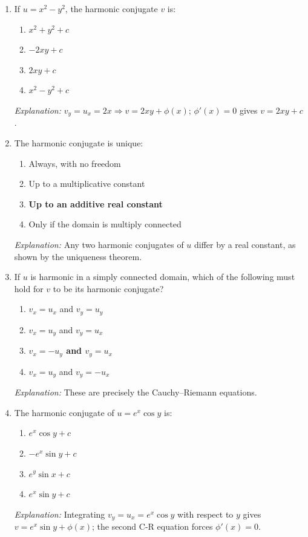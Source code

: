 \documentclass[12pt,a4paper]{article}
\begin{document}
\begin{enumerate}[label=\textbf{MCQ\arabic*.}]

\item If $u=x^2-y^2$, the harmonic conjugate $v$ is:
      \begin{enumerate}[label=(\alph*)]
        \item $x^2+y^2+c$
        \item $-2xy+c$
        \item \textbf{$2xy+c$}
        \item $x^2-y^2+c$
      \end{enumerate}
      \textit{Explanation:} $v_y=u_x=2x \Rightarrow v=2xy+\phi(x)$; $\phi'(x)=0$ gives
      $v=2xy+c$.

\item The harmonic conjugate is unique:
      \begin{enumerate}[label=(\alph*)]
        \item Always, with no freedom
        \item Up to a multiplicative constant
        \item \textbf{Up to an additive real constant}
        \item Only if the domain is multiply connected
      \end{enumerate}
      \textit{Explanation:} Any two harmonic conjugates of $u$ differ by a real constant,
      as shown by the uniqueness theorem.

\item If $u$ is harmonic in a simply connected domain, which of the following must hold
      for $v$ to be its harmonic conjugate?
      \begin{enumerate}[label=(\alph*)]
        \item $v_x=u_x$ and $v_y=u_y$
        \item $v_x=u_y$ and $v_y=u_x$
        \item \textbf{$v_x=-u_y$ and $v_y=u_x$}
        \item $v_x=u_y$ and $v_y=-u_x$
      \end{enumerate}
      \textit{Explanation:} These are precisely the Cauchy--Riemann equations.

\item The harmonic conjugate of $u=e^x\cos y$ is:
      \begin{enumerate}[label=(\alph*)]
        \item $e^x\cos y+c$
        \item $-e^x\sin y+c$
        \item $e^y\sin x+c$
        \item \textbf{$e^x\sin y+c$}
      \end{enumerate}
      \textit{Explanation:} Integrating $v_y=u_x=e^x\cos y$ with respect to $y$ gives
      $v=e^x\sin y+\phi(x)$; the second C-R equation forces $\phi'(x)=0$.


\end{enumerate}
\end{document}
